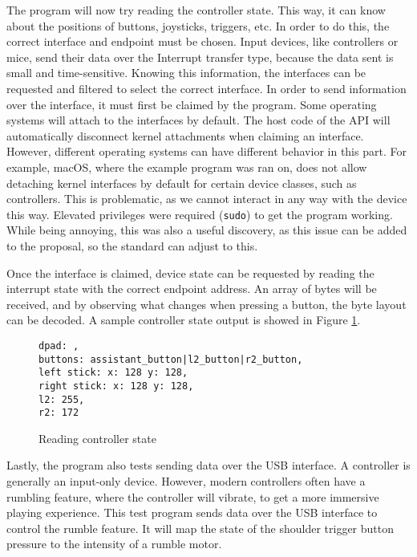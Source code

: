 The program will now try reading the controller state. This way, it can know about the positions of buttons, joysticks, triggers, etc. In order to do this, the correct interface and endpoint must be chosen. Input devices, like controllers or mice, send their data over the Interrupt transfer type, because the data sent is small and time-sensitive. Knowing this information, the interfaces can be requested and filtered to select the correct interface. In order to send information over the interface, it must first be claimed by the program. Some operating systems will attach to the interfaces by default. The host code of the API will automatically disconnect kernel attachments when claiming an interface. However, different operating systems can have different behavior in this part. For example, macOS, where the example program was ran on, does not allow detaching kernel interfaces by default for certain device classes, such as controllers. This is problematic, as we cannot interact in any way with the device this way. Elevated privileges were required (\texttt{sudo}) to get the program working. While being annoying, this was also a useful discovery, as this issue can be added to the proposal, so the standard can adjust to this.

Once the interface is claimed, device state can be requested by reading the interrupt state with the correct endpoint address. An array of bytes will be received, and by observing what changes when pressing a button, the byte layout can be decoded. A sample controller state output is showed in Figure \ref{fig:wasi_controller_sample_output}.

\begin{figure}[h]
\begin{verbatim}
dpad: ,
buttons: assistant_button|l2_button|r2_button,
left stick: x: 128 y: 128,
right stick: x: 128 y: 128,
l2: 255,
r2: 172
\end{verbatim}
\caption{Reading controller state}
\label{fig:wasi_controller_sample_output}
\end{figure}

Lastly, the program also tests sending data over the USB interface. A controller is generally an input-only device. However, modern controllers often have a rumbling feature, where the controller will vibrate, to get a more immersive playing experience. This test program sends data over the USB interface to control the rumble feature. It will map the state of the shoulder trigger button pressure to the intensity of a rumble motor.


